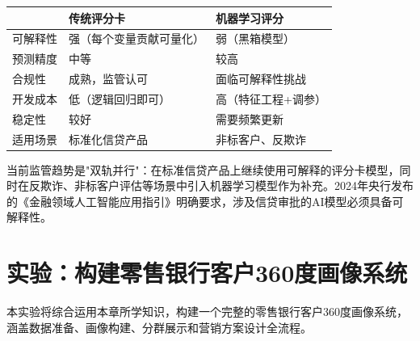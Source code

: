 \begin{theorybox}
\begin{tabular}[t]{lp{5.5cm}p{5.5cm}}
  & \textbf{传统评分卡} & \textbf{机器学习评分} \\
\midrule
可解释性 & 强（每个变量贡献可量化） & 弱（黑箱模型） \\
预测精度 & 中等 & 较高 \\
合规性 & 成熟，监管认可 & 面临可解释性挑战 \\
开发成本 & 低（逻辑回归即可） & 高（特征工程+调参） \\
稳定性 & 较好 & 需要频繁更新 \\
适用场景 & 标准化信贷产品 & 非标客户、反欺诈 \\
\end{tabular}

\vspace{0.5em}
当前监管趋势是"双轨并行"：在标准信贷产品上继续使用可解释的评分卡模型，同时在反欺诈、非标客户评估等场景中引入机器学习模型作为补充。2024年央行发布的《金融领域人工智能应用指引》明确要求，涉及信贷审批的AI模型必须具备可解释性。
\end{theorybox}

\section{实验：构建零售银行客户360度画像系统}

本实验将综合运用本章所学知识，构建一个完整的零售银行客户360度画像系统，涵盖数据准备、画像构建、分群展示和营销方案设计全流程。

